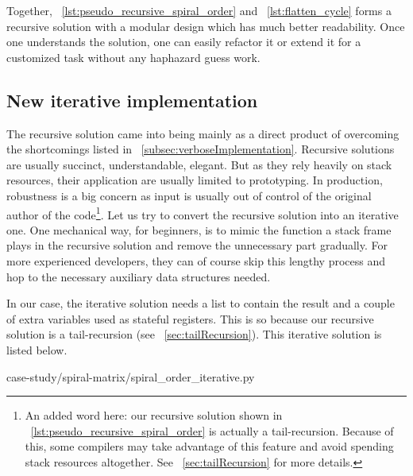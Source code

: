 %

Together, ~\autoref{lst:pseudo_recursive_spiral_order} and ~\autoref{lst:flatten_cycle}
forms a recursive solution with a modular design which has much better readability.
Once one understands the solution, one can easily refactor it or extend it for a customized task
without any haphazard guess work.


\subsection{New iterative implementation}\label{subsec:newIterative.spiralMatrix}

The recursive solution came into being mainly as a direct product of overcoming the shortcomings
listed in ~\autoref{subsec:verboseImplementation}.
Recursive solutions are usually succinct, understandable, elegant.
But as they rely heavily on stack resources, their application are usually limited to prototyping.
In production, robustness is a big concern as input is usually out of control of the original
author of the code\footnote{An added word here: our recursive solution shown in
~\autoref{lst:pseudo_recursive_spiral_order} is actually a tail-recursion.
Because of this, some compilers may take advantage of this feature and avoid spending stack
resources altogether.
See ~\autoref{sec:tailRecursion} for more details.}.
Let us try to convert the recursive solution into an iterative one.
One mechanical way, for beginners, is to mimic the function a stack frame plays in the recursive
solution and remove the unnecessary part gradually.
For more experienced developers, they can of course skip this lengthy process and hop to the
necessary auxiliary data structures needed.

In our case, the iterative solution needs a list to contain the result and a couple of extra
variables used as stateful registers.
This is so because our recursive solution is a tail-recursion (see ~\autoref{sec:tailRecursion}).
This iterative solution is listed below.

{case-study/spiral-matrix/spiral_order_iterative.py}

